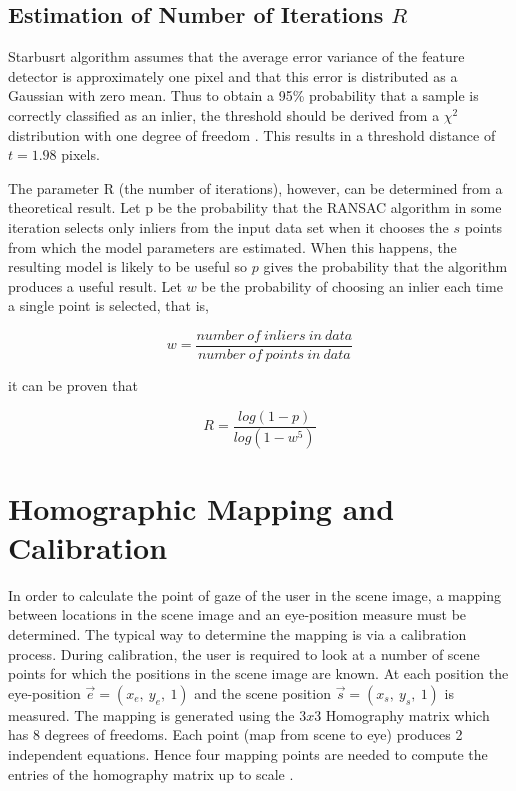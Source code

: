 \documentclass[12pt,fleqn]{book} %
\begin{document}
\subsection{Estimation of Number of Iterations $R$}
Starbusrt algorithm assumes that the average error variance of the feature detector is approximately one pixel and that this error is distributed as a Gaussian with zero mean. Thus to obtain a 95\% probability that a sample is correctly classified as an inlier, the threshold should be derived from a $\chi^{2}$ distribution with one degree of freedom \cite{multipleViewGeom}. This results in a threshold distance of $t = 1.98$ pixels. \bigskip

The parameter R (the number of iterations), however, can be determined from a theoretical result. Let p be the probability that the RANSAC algorithm in some iteration selects only inliers from the input data set when it chooses the $s$ points from which the model parameters are estimated. When this happens, the resulting model is likely to be useful so $p$ gives the probability that the algorithm produces a useful result. Let $w$ be the probability of choosing an inlier each time a single point is selected, that is, 
\begin{dBox}
	$$ w = \frac{number \: of \: inliers \: in \: data}{number \: of \: points \: in \: data} $$
\end{dBox}
it can be proven that 
\begin{dBox}
\begin{equation}
		R = \frac{log(1-p)}{log(1-w^{5})}
\end{equation}
\end{dBox}

\section{Homographic Mapping and Calibration}
In order to calculate the point of gaze of the user in the scene image, a mapping between locations in the scene image and an eye-position measure must be determined. The typical way to determine the mapping is via a calibration process. During calibration, the user is required to look at a number of scene points for which the positions in the scene image are known. At each position the eye-position $\vec{e} = (x_{e} ,\: y_{e},\: 1)$ and the scene position $\vec{s} = (x_{s},\: y_{s},\: 1)$ is measured. The mapping is generated using the $3x3$ Homography matrix which has 8 degrees of freedoms. Each point (map from scene to eye) produces 2 independent equations. Hence four mapping points are needed to compute the entries of the homography matrix up to scale \cite{heuristic}. \bigskip
\end{document}
